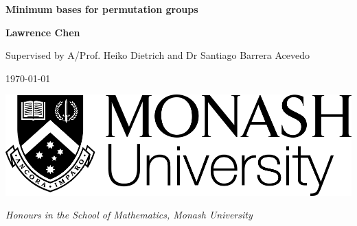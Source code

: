 \begin{titlepage}
    \begin{center}
        \vspace*{4cm}

        \Huge
        \textbf{Minimum bases for permutation groups}

        \vspace{2cm}

        \LARGE
        \textbf{Lawrence Chen}

        \Large
        Supervised by A/Prof. Heiko Dietrich and Dr Santiago Barrera Acevedo

        \vspace{2cm}

        \Large
        \today


        \vspace{4cm}
        \begin{center}
            \includegraphics[scale=0.4]{monash_university_logo.png}
        \end{center}
        \vfill

        \textit{Honours \thesis{} in the School of Mathematics, Monash University}
    \end{center}
\end{titlepage}